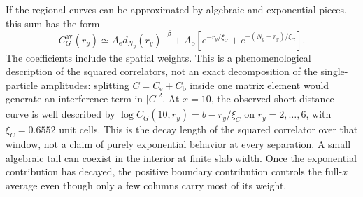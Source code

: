 If the regional curves can be approximated by algebraic and exponential
pieces, this sum has the form
\begin{equation}
 \overline{C_G^{\mathrm{av}}(r_y)}
 \simeq A_{\mathrm e}d_{N_y}(r_y)^{-\beta}
 +A_{\mathrm b}\left[e^{-r_y/\xi_C}+e^{-(N_y-r_y)/\xi_C}\right].
 \label{eq:EndpointCorrelatorMixedDecay}
\end{equation}
The coefficients include the spatial weights.  This is a phenomenological
description of the squared correlators, not an exact decomposition of the
single-particle amplitudes: splitting $C=C_{\mathrm e}+C_{\mathrm b}$
inside one matrix element would generate an interference term in $|C|^2$.
At $x=10$, the observed short-distance curve is well described by
$\log\overline{C_G(10,r_y)}=b-r_y/\xi_C$ on $r_y=2,\ldots,6$, with
$\xi_C=0.6552$ unit cells.  This is the decay length of the squared
correlator over that window, not a claim of purely exponential behavior
at every separation.  A small algebraic tail can coexist in the interior
at finite slab width.  Once the exponential contribution has decayed,
the positive boundary contribution controls the full-$x$ average even
though only a few columns carry most of its weight.
